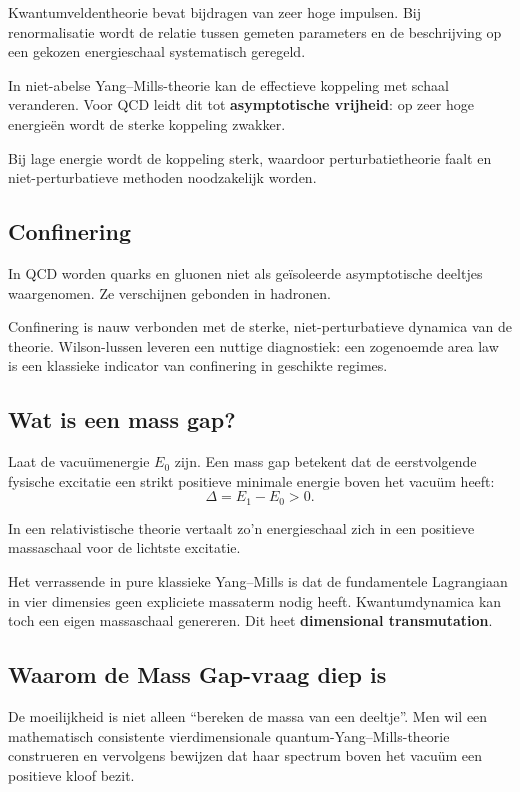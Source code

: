 \documentclass[11pt,a4paper]{article}
\begin{document}
Kwantumveldentheorie bevat bijdragen van zeer hoge impulsen. Bij renormalisatie wordt de relatie tussen gemeten parameters en de beschrijving op een gekozen energieschaal systematisch geregeld.

In niet-abelse Yang--Mills-theorie kan de effectieve koppeling met schaal veranderen. Voor QCD leidt dit tot \textbf{asymptotische vrijheid}: op zeer hoge energieën wordt de sterke koppeling zwakker.

Bij lage energie wordt de koppeling sterk, waardoor perturbatietheorie faalt en niet-perturbatieve methoden noodzakelijk worden.

\subsection{Confinering}

In QCD worden quarks en gluonen niet als geïsoleerde asymptotische deeltjes waargenomen. Ze verschijnen gebonden in hadronen.

Confinering is nauw verbonden met de sterke, niet-perturbatieve dynamica van de theorie. Wilson-lussen leveren een nuttige diagnostiek: een zogenoemde area law is een klassieke indicator van confinering in geschikte regimes.

\subsection{Wat is een mass gap?}

Laat de vacuümenergie $E_0$ zijn. Een mass gap betekent dat de eerstvolgende fysische excitatie een strikt positieve minimale energie boven het vacuüm heeft:
\[
\Delta=E_1-E_0>0.
\]

In een relativistische theorie vertaalt zo'n energieschaal zich in een positieve massaschaal voor de lichtste excitatie.

Het verrassende in pure klassieke Yang--Mills is dat de fundamentele Lagrangiaan in vier dimensies geen expliciete massaterm nodig heeft. Kwantumdynamica kan toch een eigen massaschaal genereren. Dit heet \textbf{dimensional transmutation}.

\subsection{Waarom de Mass Gap-vraag diep is}

De moeilijkheid is niet alleen ``bereken de massa van een deeltje''. Men wil een mathematisch consistente vierdimensionale quantum-Yang--Mills-theorie construeren en vervolgens bewijzen dat haar spectrum boven het vacuüm een positieve kloof bezit.
\end{document}
